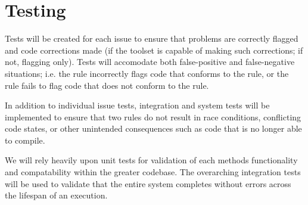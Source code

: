 \documentclass[11pt]{scrreprt}
\begin{document}
\section{Testing}
Tests will be created for each issue to ensure that problems are correctly flagged and code corrections made (if the toolset is capable of making such corrections; if not, flagging only). Tests will accomodate both false-positive and false-negative situations; i.e. the rule incorrectly flags code that conforms to the rule, or the rule fails to flag code that does not conform to the rule.

In addition to individual issue tests, integration and system tests will be implemented to ensure that two rules do not result in race conditions, conflicting code states, or other unintended consequences such as code that is no longer able to compile.

We will rely heavily upon unit tests for validation of each methods functionality and compatability within the greater codebase. The overarching integration tests will be used to validate that the entire system completes without errors across the lifespan of an execution.
\end{document}
